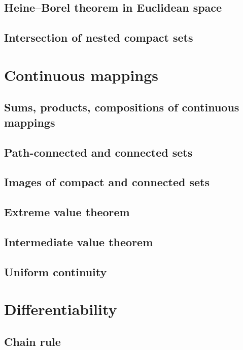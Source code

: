\documentclass[11pt]{article}
\theoremstyle{definition}
\theoremstyle{plain}
\theoremstyle{remark}
\begin{document}
\subsection{Heine–Borel theorem in Euclidean space}

\subsection{Intersection of nested compact sets}

\section{Continuous mappings}

\subsection{Sums, products, compositions of continuous mappings}

\subsection{Path-connected and connected sets}

\subsection{Images of compact and connected sets}

\subsection{Extreme value theorem}

\subsection{Intermediate value theorem}

\subsection{Uniform continuity}

\section{Differentiability}

\subsection{Chain rule}
\end{document}
